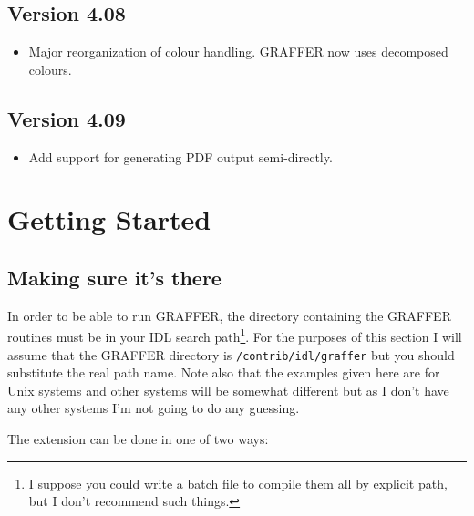 \documentclass[11pt,twoside,english]{article}
\begin{document}
\subsection{Version 4.08}
\label{sec:v408}

\begin{itemize}
\item Major reorganization of colour handling. GRAFFER now uses
  decomposed colours. 
\end{itemize}

\subsection{Version 4.09}
\label{sec:v409}

\begin{itemize}
\item Add support for generating PDF output semi-directly.
\end{itemize}
\section{Getting Started}


\subsection{Making sure it's there}

In order to be able to run GRAFFER, the directory containing the
GRAFFER routines must be in your IDL search path\footnote{I suppose you
  could write a batch file to compile them all by explicit path, but I
  don't recommend such things.}. For the purposes of this section I
will assume that the GRAFFER directory is \texttt{/contrib/idl/graffer}
but you should substitute the real path name. Note also that the
examples given here are for Unix systems and other systems will be
somewhat different but as I don't have any other systems I'm not going
to do any guessing.

The extension can be done in one of two ways:
\end{document}
